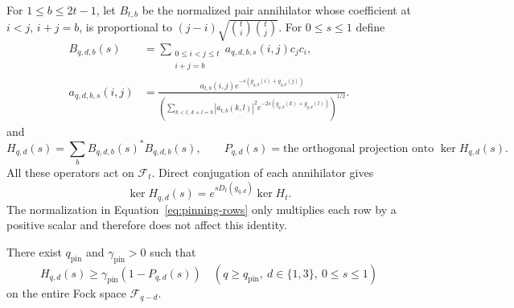 For $1\le b\le2t-1$, let $B_{t,b}$ be the normalized pair annihilator
whose coefficient at $i<j$, $i+j=b$, is proportional to
$(j-i)\sqrt{\binom ti\binom tj}$.  For $0\le s\le1$ define
\begin{equation}
 \begin{aligned}
 B_{q,d,b}(s)&=\sum_{\substack{0\le i<j\le t\\i+j=b}}
             a_{q,d,b,s}(i,j)c_jc_i,\\
 a_{q,d,b,s}(i,j)&=
 \frac{a_{t,b}(i,j)e^{-s(g_{q,d}(i)+g_{q,d}(j))}}
 {\left(\sum_{k<l,\ k+l=b}|a_{t,b}(k,l)|^2
          e^{-2s(g_{q,d}(k)+g_{q,d}(l))}\right)^{1/2}}.
 \end{aligned}
 \label{eq:pinning-rows}
\end{equation}
and
\[
 H_{q,d}(s)=\sum_b B_{q,d,b}(s)^*B_{q,d,b}(s),\qquad
 P_{q,d}(s)=\text{the orthogonal projection onto }\ker H_{q,d}(s).
\]
All these operators act on $\mathcal F_t$.  Direct conjugation of each
annihilator gives
\begin{equation}
 \ker H_{q,d}(s)=e^{sD_t(g_{q,d})}\ker H_t.
 \label{eq:pinning-path-kernel}
\end{equation}
The normalization in Equation~\eqref{eq:pinning-rows} only multiplies each
row by a positive scalar and therefore does not affect this identity.

\begin{lemma}
\label{pinning:uniform-gap}
There exist $q_{\mathrm{pin}}$ and $\gamma_{\mathrm{pin}}>0$ such that
\[
 H_{q,d}(s)\ge\gamma_{\mathrm{pin}}(1-P_{q,d}(s))
 \quad(q\ge q_{\mathrm{pin}},\ d\in\{1,3\},\ 0\le s\le1)
\]
on the entire Fock space $\mathcal F_{q-d}$.
\end{lemma}

